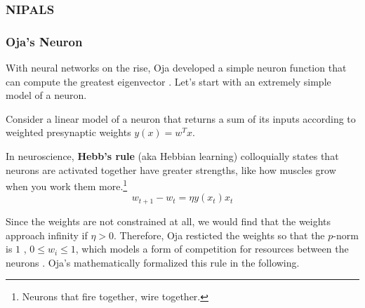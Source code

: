 \subsubsection{NIPALS}

\subsubsection{Oja's Neuron}

  With neural networks on the rise, Oja developed a simple neuron function that can compute the greatest eigenvector \cite{1982oja}. Let's start with an extremely simple model of a neuron. 

  \begin{definition}[Neuron]
    Consider a linear model of a neuron that returns a sum of its inputs according to weighted presynaptic weights $y(x) = w^T x$. 
  \end{definition} 

  \begin{definition}
    In neuroscience, \textbf{Hebb's rule} (aka Hebbian learning) colloquially states that neurons are activated together have greater strengths, like how muscles grow when you work them more.\footnote{Neurons that fire together, wire together.}  
    \begin{equation}
      w_{t+1} - w_t = \eta y(x_t) x_t
    \end{equation}
  \end{definition}

  Since the weights are not constrained at all, we would find that the weights approach infinity if $\eta > 0$. Therefore, Oja resticted the weights so that the $p$-norm is $1$ , $0 \leq w_i \leq 1$, which models a form of competition for resources between the neurons \cite{1982oja}. Oja's mathematically formalized this rule in the following. 

